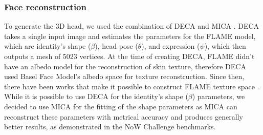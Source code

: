 
\subsubsection{Face reconstruction}

To generate the 3D head, we used the combination of DECA \cite{fengLearningAnimatableDetailed2021} and MICA \cite{zielonkaMetricalReconstructionHuman2022}. DECA takes a single input image and estimates the parameters for the FLAME model, which are identity's shape ($\beta$), head pose ($\theta$), and expression ($\psi$), which then outputs a mesh of 5023 vertices. At the time of creating DECA, FLAME didn't have an albedo model for the reconstruction of skin texture, therefore DECA used Basel Face Model's albedo space for texture reconstruction. Since then, there have been works that make it possible to construct FLAME texture space \cite{fengPhotometricFLAMEFitting2023,smithMorphableFaceAlbedo2020}. While it is possible to use DECA for the identity's shape ($\beta$) parameters, we decided to use MICA for the fitting of the shape parameters as MICA can reconstruct these parameters with metrical accuracy and produces generally better results, as demonstrated in the NoW Challenge \cite{RingNet:CVPR:2019} benchmarks.


